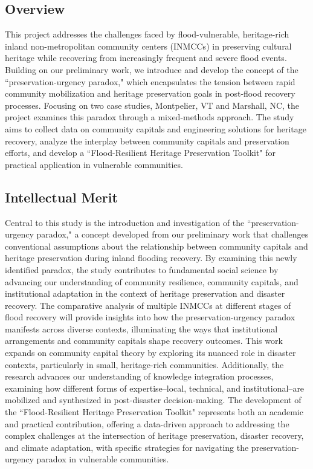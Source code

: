 \documentclass[11pt]{article}
\begin{document}
%
\pagestyle{empty} 
\vspace{-0.3cm}
\subsection{Overview} 
\vspace{-0.3cm}
This project addresses the challenges faced by flood-vulnerable, heritage-rich inland non-metropolitan community centers (INMCCs) in preserving cultural heritage while recovering from increasingly frequent and severe flood events.
Building on our preliminary work, we introduce and develop the concept of the ``preservation-urgency paradox," which encapsulates the tension between rapid community mobilization and heritage preservation goals in post-flood recovery processes. 
Focusing on two case studies, Montpelier, VT and Marshall, NC, the project examines this paradox through a mixed-methods approach. 
The study aims to collect data on community capitals and engineering solutions for heritage recovery, analyze the interplay between community capitals and preservation efforts, and develop a ``Flood-Resilient Heritage Preservation Toolkit" for practical application in vulnerable communities.
\vspace{-0.5cm}
\subsection{Intellectual Merit} 
\vspace{-0.3cm}
Central to this study is the introduction and investigation of the ``preservation-urgency paradox," a concept developed from our preliminary work that challenges conventional assumptions about the relationship between community capitals and heritage preservation during inland flooding recovery. 
By examining this newly identified paradox, the study contributes to fundamental social science by advancing our understanding of community resilience, community capitals, and institutional adaptation in the context of heritage preservation and disaster recovery. 
The comparative analysis of multiple INMCCs at different stages of flood recovery will provide insights into how the preservation-urgency paradox manifests across diverse contexts, illuminating the ways that institutional arrangements and community capitals shape recovery outcomes. 
This work expands on community capital theory by exploring its nuanced role in disaster contexts, particularly in small, heritage-rich communities. 
Additionally, the research advances our understanding of knowledge integration processes, examining how different forms of expertise--local, technical, and institutional--are mobilized and synthesized in post-disaster decision-making. 
The development of the ``Flood-Resilient Heritage Preservation Toolkit" represents both an academic and practical contribution, offering a data-driven approach to addressing the complex challenges at the intersection of heritage preservation, disaster recovery, and climate adaptation, with specific strategies for navigating the preservation-urgency paradox in vulnerable communities.
\vspace{-0.5cm}
\end{document}

